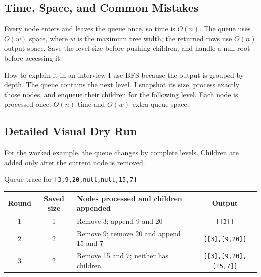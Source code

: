 \subsection{Time, Space, and Common Mistakes}
Every node enters and leaves the queue once, so time is \(O(n)\). The queue
uses \(O(w)\) space, where \(w\) is the maximum tree width; the returned rows
use \(O(n)\) output space. Save the level size before pushing children, and
handle a null root before accessing it.

\begin{revisionbox}{How to explain it in an interview}
I use BFS because the output is grouped by depth. The queue contains the next
level. I snapshot its size, process exactly those nodes, and enqueue their
children for the following level. Each node is processed once: \(O(n)\) time
and \(O(w)\) extra queue space.
\end{revisionbox}

\subsection{Detailed Visual Dry Run}
For the worked example, the queue changes by complete levels. Children are
added only after the current node is removed.

\begin{dryrunbox}{Queue trace for \texttt{[3,9,20,null,null,15,7]}}
\begin{center}
\begin{tabularx}{\linewidth}{@{}c c X c@{}}
\toprule
Round & Saved size & Nodes processed and children appended & Output \\
\midrule
1 & 1 & Remove 3; append 9 and 20 & \texttt{[[3]]} \\
2 & 2 & Remove 9; remove 20 and append 15 and 7 & \texttt{[[3],[9,20]]} \\
3 & 2 & Remove 15 and 7; neither has children & \texttt{[[3],[9,20],[15,7]]} \\
\bottomrule
\end{tabularx}
\end{center}
\end{dryrunbox}

